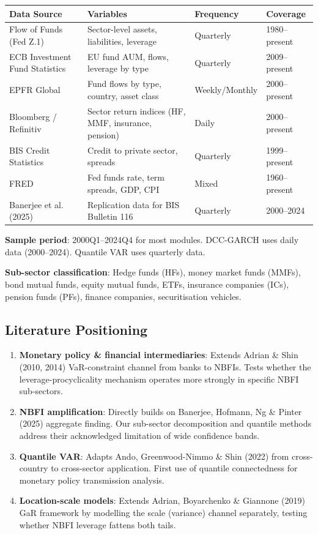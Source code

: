 \documentclass[11pt,a4paper]{article}
\begin{document}
{\small
\begin{longtable}{|p{}|p{}|p{}|p{}|}
\hline
\textbf{Data Source} & \textbf{Variables} & \textbf{Frequency} & \textbf{Coverage} \\
\hline
\endhead
Flow of Funds (Fed Z.1) & Sector-level assets, liabilities, leverage & Quarterly & 1980--present \\
\hline
ECB Investment Fund Statistics & EU fund AUM, flows, leverage by type & Quarterly & 2009--present \\
\hline
EPFR Global & Fund flows by type, country, asset class & Weekly/Monthly & 2000--present \\
\hline
Bloomberg / Refinitiv & Sector return indices (HF, MMF, insurance, pension) & Daily & 2000--present \\
\hline
BIS Credit Statistics & Credit to private sector, spreads & Quarterly & 1999--present \\
\hline
FRED & Fed funds rate, term spreads, GDP, CPI & Mixed & 1960--present \\
\hline
Banerjee et al. (2025) & Replication data for BIS Bulletin 116 & Quarterly & 2000--2024 \\
\hline
\end{longtable}
}

\textbf{Sample period}: 2000Q1--2024Q4 for most modules. DCC-GARCH uses daily data (2000--2024). Quantile VAR uses quarterly data.

\textbf{Sub-sector classification}: Hedge funds (HFs), money market funds (MMFs), bond mutual funds, equity mutual funds, ETFs, insurance companies (ICs), pension funds (PFs), finance companies, securitisation vehicles.


\subsection{Literature Positioning}

\begin{enumerate}
\item \textbf{Monetary policy \& financial intermediaries}: Extends Adrian \& Shin (2010, 2014) VaR-constraint channel from banks to NBFIs. Tests whether the leverage-procyclicality mechanism operates more strongly in specific NBFI sub-sectors.

\item \textbf{NBFI amplification}: Directly builds on Banerjee, Hofmann, Ng \& Pinter (2025) aggregate finding. Our sub-sector decomposition and quantile methods address their acknowledged limitation of wide confidence bands.

\item \textbf{Quantile VAR}: Adapts Ando, Greenwood-Nimmo \& Shin (2022) from cross-country to cross-sector application. First use of quantile connectedness for monetary policy transmission analysis.

\item \textbf{Location-scale models}: Extends Adrian, Boyarchenko \& Giannone (2019) GaR framework by modelling the scale (variance) channel separately, testing whether NBFI leverage fattens both tails.

\end{enumerate}
\end{document}
